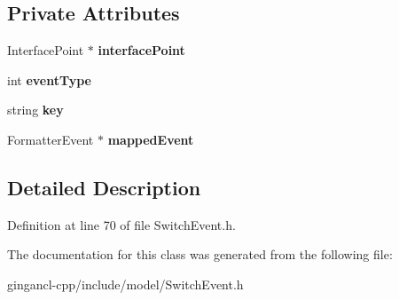 \subsection*{Private Attributes}
\begin{CompactItemize}
\item 
InterfacePoint $\ast$ {\bf interfacePoint}\label{classbr_1_1pucrio_1_1telemidia_1_1ginga_1_1ncl_1_1model_1_1switches_1_1SwitchEvent_a44a74e86ace72cb72cd248dcfac9749}

\item 
int {\bf eventType}\label{classbr_1_1pucrio_1_1telemidia_1_1ginga_1_1ncl_1_1model_1_1switches_1_1SwitchEvent_a73ed1819d01004c05b8b1908ef91ef4}

\item 
string {\bf key}\label{classbr_1_1pucrio_1_1telemidia_1_1ginga_1_1ncl_1_1model_1_1switches_1_1SwitchEvent_a8fa75d45876bcbe59f33f49e7d3572d}

\item 
FormatterEvent $\ast$ {\bf mappedEvent}\label{classbr_1_1pucrio_1_1telemidia_1_1ginga_1_1ncl_1_1model_1_1switches_1_1SwitchEvent_7144fd18f4ec798d7a97391ac8dd6fd7}

\end{CompactItemize}


\subsection{Detailed Description}




Definition at line 70 of file SwitchEvent.h.

The documentation for this class was generated from the following file:\begin{CompactItemize}
\item 
gingancl-cpp/include/model/SwitchEvent.h\end{CompactItemize}
